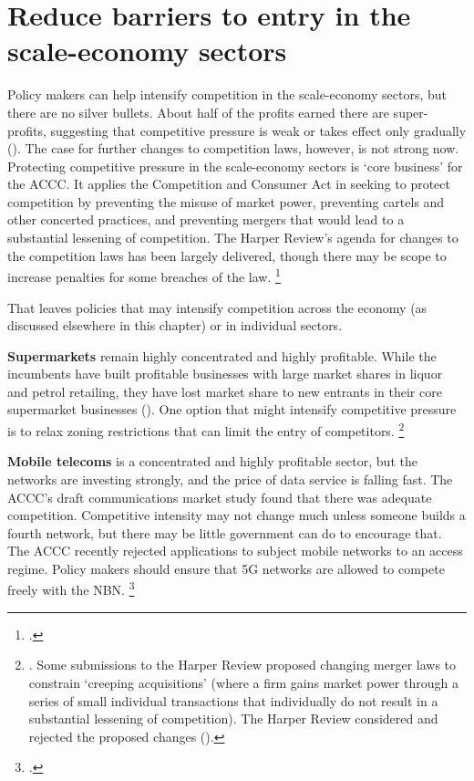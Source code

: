 \section{Reduce barriers to entry in the scale-economy sectors}
Policy makers can help intensify competition in the scale-economy sectors, but there are no silver bullets. About half of the profits earned there are super-profits, suggesting that competitive pressure is weak or takes effect only gradually ().
The case for further changes to competition laws, however, is not strong now.
Protecting competitive pressure in the scale-economy sectors is `core business' for the ACCC\@.
It applies the Competition and Consumer Act in seeking to protect competition by preventing the misuse of market power, preventing cartels and other concerted practices, and preventing mergers that would lead to a substantial lessening of competition. The Harper Review's agenda for changes to the competition laws has been largely delivered, though there may be scope to increase penalties for some breaches of the law.%
\footcites{Harper2015Competition}{Morrison2017Competition}{Caronpenalties2017}

That leaves policies that may intensify competition across the economy (as discussed elsewhere in this chapter) or in individual sectors.%

\textbf{Supermarkets} remain highly concentrated and highly profitable. While the incumbents have built profitable businesses with large market shares in liquor and petrol retailing, they have lost market share to new entrants in their core supermarket businesses (). One option that might intensify competitive pressure is to relax zoning restrictions that can limit the entry of competitors.%
\footnote{\textcites{ACCC-grocery-2008}{PC-retail-2011}. Some submissions to the Harper Review proposed changing merger laws to constrain `creeping acquisitions' (where a firm gains market power through a series of small individual transactions that individually do not result in a substantial lessening of competition). The Harper Review considered and rejected the proposed changes (\textcite{Harper2015Competition}).}
\CenturyFootnote

\textbf{Mobile telecoms} is a concentrated and highly profitable sector, but the networks are investing strongly, and the price of data service is falling fast. The ACCC's draft communications market study found that there was adequate competition. Competitive intensity may not change much unless someone builds a fourth network, but there may be little government can do to encourage that. The ACCC recently rejected applications to subject mobile networks to an access regime. Policy makers should ensure that 5G networks are allowed to compete freely with the NBN.%
\footcites{ACCCCommsMarketStudyDraft2017}{ACCC-mobile-services}

